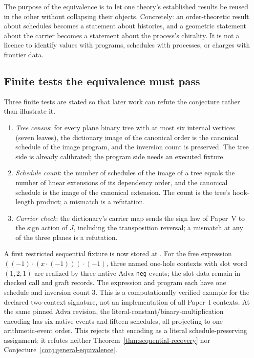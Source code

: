 \begin{proposal}\label{prop:equivalence-role}
The purpose of the equivalence is to let one theory's established results be reused
in the other without collapsing their objects.  Concretely: an order-theoretic result
about schedules becomes a statement about histories, and a geometric statement about
the carrier becomes a statement about the process's chirality.  It is not a licence to
identify values with programs, schedules with processes, or charges with frontier
data.
\end{proposal}

\subsection{Finite tests the equivalence must pass}

Three finite tests are stated so that later work can refute the conjecture rather
than illustrate it.

\begin{enumerate}
\item \emph{Tree census}: for every plane binary tree with at most six internal
  vertices (seven leaves), the dictionary
  image of the canonical order is the canonical schedule of the image program, and the
  inversion count is preserved.  The tree side is already calibrated; the program side
  needs an executed fixture.
\item \emph{Schedule count}: the number of schedules of the image of a tree equals the
  number of linear extensions of its dependency order, and the canonical schedule is
  the image of the canonical extension.  The count is the tree's hook-length product;
  a mismatch is a refutation.
\item \emph{Carrier check}: the dictionary's carrier map sends the sign law of
  Paper~V to the sign action of $J$, including the transposition reversal; a mismatch
  at any of the three planes is a refutation.
\end{enumerate}

A first restricted sequential fixture is now stored at
.  For the free expression
$((-1)\cdot(x\cdot(-1)))\cdot(-1)$, three named one-hole contexts with slot word
$(1,2,1)$ are realized by three native Adva \texttt{neg} events; the slot data
remain in checked call and graft records.  The expression and program each have
one schedule and inversion count $3$.  This is a computationally verified example
for the declared two-context signature, not an implementation of all Paper~I
contexts.  At the same pinned Adva revision, the literal-constant/binary-multiplication
encoding has six native events and fifteen schedules, all projecting to one
arithmetic-event order.  This rejects that encoding as a literal schedule-preserving
assignment; it refutes neither Theorem~\ref{thm:sequential-recovery} nor
Conjecture~\ref{conj:general-equivalence}.

